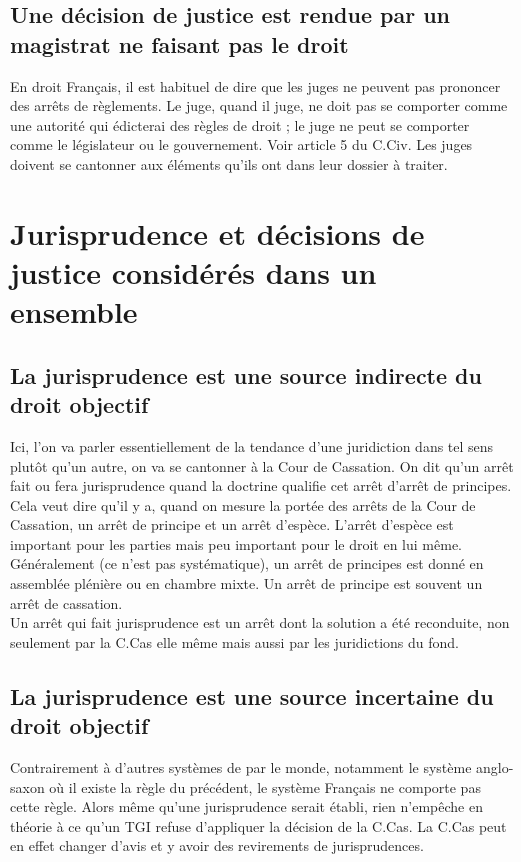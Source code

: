 \subsection{Une décision de justice est rendue par un magistrat ne faisant pas le droit}

En droit Français, il est habituel de dire que les juges ne peuvent pas prononcer des arrêts de règlements. Le juge, quand il juge, ne doit pas se comporter comme une autorité qui édicterai des règles de droit ; le juge ne peut se comporter comme le législateur ou le gouvernement. Voir article 5 du C.Civ. Les juges doivent se cantonner aux éléments qu'ils ont dans leur dossier à traiter. 

\section{Jurisprudence et décisions de justice considérés dans un ensemble}

\subsection{La jurisprudence est une source indirecte du droit objectif}

Ici, l'on va parler essentiellement de la tendance d'une juridiction dans tel sens plutôt qu'un autre, on va se cantonner à la Cour de Cassation. On dit qu'un arrêt fait ou fera jurisprudence quand la doctrine qualifie cet arrêt d'arrêt de principes. Cela veut dire qu'il y a, quand on mesure la portée des arrêts de la Cour de Cassation, un arrêt de principe et un arrêt d'espèce. L'arrêt d'espèce est important pour les parties mais peu important pour le droit en lui même. \\
Généralement (ce n'est pas systématique), un arrêt de principes est donné en assemblée plénière ou en chambre mixte. Un arrêt de principe est souvent un arrêt de cassation. \\
Un arrêt qui fait jurisprudence est un arrêt dont la solution a été reconduite, non seulement par la C.Cas elle même mais aussi par les juridictions du fond.



\subsection{La jurisprudence est une source incertaine du droit objectif}

Contrairement à d'autres systèmes de par le monde, notamment le système anglo-saxon où il existe la règle du précédent, le système Français ne comporte pas cette règle. Alors même qu'une jurisprudence serait établi, rien n'empêche en théorie à ce qu'un TGI refuse d'appliquer la décision de la C.Cas. La C.Cas peut en effet changer d'avis et y avoir des revirements de jurisprudences. 

